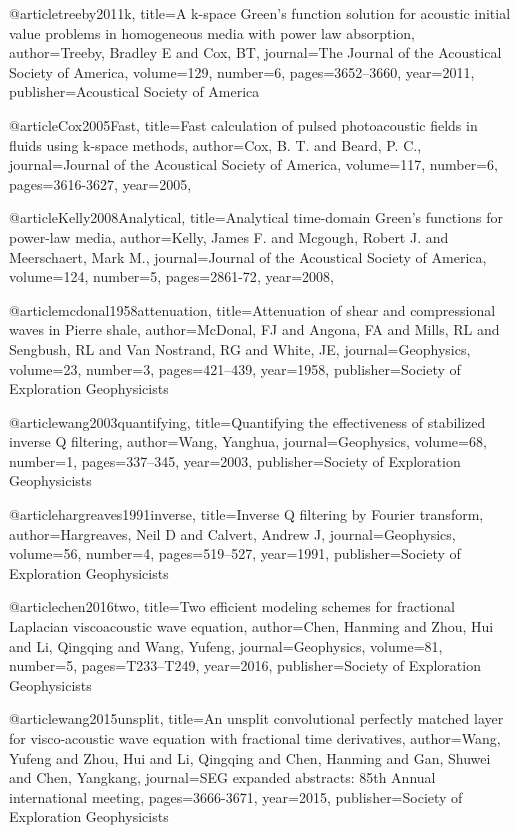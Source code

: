 {@article{treeby2011k,
  title={A k-space Green's function solution for acoustic initial value problems in homogeneous media with power law absorption},
  author={Treeby, Bradley E and Cox, BT},
  journal={The Journal of the Acoustical Society of America},
  volume={129},
  number={6},
  pages={3652--3660},
  year={2011},
  publisher={Acoustical Society of America}
}

@article{Cox2005Fast,
  title={Fast calculation of pulsed photoacoustic fields in fluids using k-space methods},
  author={Cox, B. T. and Beard, P. C.},
  journal={Journal of the Acoustical Society of America},
  volume={117},
  number={6},
  pages={3616-3627},
  year={2005},
}

@article{Kelly2008Analytical,
  title={Analytical time-domain Green's functions for power-law media},
  author={Kelly, James F. and Mcgough, Robert J. and Meerschaert, Mark M.},
  journal={Journal of the Acoustical Society of America},
  volume={124},
  number={5},
  pages={2861-72},
  year={2008},
}

@article{mcdonal1958attenuation,
  title={Attenuation of shear and compressional waves in Pierre shale},
  author={McDonal, FJ and Angona, FA and Mills, RL and Sengbush, RL and Van Nostrand, RG and White, JE},
  journal={Geophysics},
  volume={23},
  number={3},
  pages={421--439},
  year={1958},
  publisher={Society of Exploration Geophysicists}
}

@article{wang2003quantifying,
  title={Quantifying the effectiveness of stabilized inverse {Q} filtering},
  author={Wang, Yanghua},
  journal={Geophysics},
  volume={68},
  number={1},
  pages={337--345},
  year={2003},
  publisher={Society of Exploration Geophysicists}
}

@article{hargreaves1991inverse,
  title={Inverse {Q} filtering by Fourier transform},
  author={Hargreaves, Neil D and Calvert, Andrew J},
  journal={Geophysics},
  volume={56},
  number={4},
  pages={519--527},
  year={1991},
  publisher={Society of Exploration Geophysicists}
}

@article{chen2016two,
  title={Two efficient modeling schemes for fractional {L}aplacian viscoacoustic wave equation},
  author={Chen, Hanming and Zhou, Hui and Li, Qingqing and Wang, Yufeng},
  journal={Geophysics},
  volume={81},
  number={5},
  pages={T233--T249},
  year={2016},
  publisher={Society of Exploration Geophysicists}
}

@article{wang2015unsplit,
  title={An unsplit convolutional perfectly matched layer for visco-acoustic wave equation with fractional time derivatives},
  author={Wang, Yufeng and Zhou, Hui and Li, Qingqing and Chen, Hanming and Gan, Shuwei and Chen, Yangkang},
  journal={SEG expanded abstracts: 85th Annual international meeting},
  pages={3666-3671},
  year={2015},
  publisher={Society of Exploration Geophysicists}
}

}

